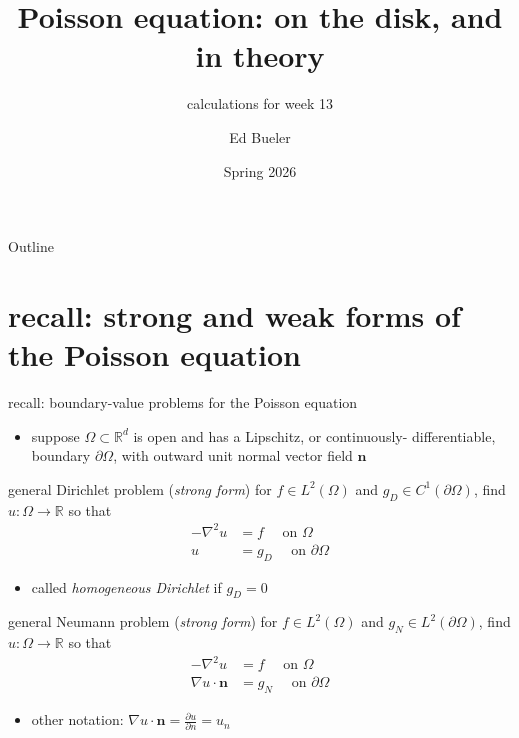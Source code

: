 \documentclass[10pt,
               svgnames,
               hyperref={colorlinks,
                         citecolor=DeepPink4,
                         linkcolor=FireBrick,
                         urlcolor=blue},
               usepdftitle=false]{beamer}
\title[more on the Poisson equation]{Poisson equation: on the disk, and in theory}
\subtitle{calculations for week 13}
\author{Ed Bueler}
\institute[]{UAF Math 617 Functional Analysis}
\date{Spring 2026}
\newcommand{\bn}{\mathbf{n}}
\newcommand{\RR}{\mathbb{R}}
\newcommand{\grad}{\nabla}
\begin{document}
\beamertemplatenavigationsymbolsempty

\begin{frame}
  \maketitle
\end{frame}


\begin{frame}{Outline}
  \tableofcontents[hideallsubsections]
\end{frame}

\AtBeginSection[]
{%
}


\section{recall: strong and weak forms of the Poisson equation}


\begin{frame}{recall: boundary-value problems for the Poisson equation}

\begin{itemize}
\item suppose $\Omega\subset \RR^d$ is open and has a Lipschitz, or continuously- differentiable, boundary $\partial\Omega$, with outward unit normal vector field $\bn$
\end{itemize}

\begin{block}{general Dirichlet problem (\emph{strong form})}
for $f\in L^2(\Omega)$ and $g_D\in C^1(\partial\Omega)$, find $u:\Omega\to \RR$ so that
\begin{align*}
- \grad^2 u &= f \quad \text{ on } \Omega \\
u &= g_D \quad \text{ on } \partial \Omega
\end{align*}
\end{block}

\begin{itemize}
\item called \emph{homogeneous Dirichlet} if $g_D=0$
\end{itemize}

\begin{block}{general Neumann problem (\emph{strong form})}
for $f\in L^2(\Omega)$ and $g_N\in L^2(\partial\Omega)$, find $u:\Omega\to \RR$ so that
\begin{align*}
- \grad^2 u &= f \quad \text{ on } \Omega \\
\grad u\cdot \bn &= g_N \quad \text{ on } \partial \Omega
\end{align*}
\end{block}

\begin{itemize}
\item other notation: $\grad u\cdot \bn = \frac{\partial u}{\partial n} = u_n$
\end{itemize}
\end{frame}
\end{document}
